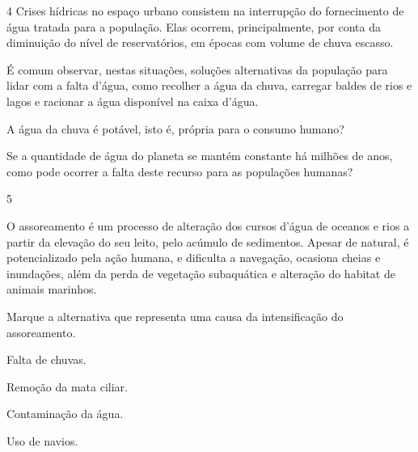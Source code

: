 \num{4} Crises hídricas no espaço urbano consistem na interrupção
do fornecimento de água tratada para a população. Elas ocorrem,
principalmente, por conta da diminuição do nível de reservatórios, em
épocas com volume de chuva escasso.

É comum observar, nestas situações, soluções alternativas da população
para lidar com a falta d'água, como recolher a água da chuva, carregar
baldes de rios e lagos e racionar a água disponível na caixa d'água.

\begin{escolha}
\item A água da chuva é potável, isto é, própria para o consumo
humano?



\item Se a quantidade de água do planeta se mantém constante há
milhões de anos, como pode ocorrer a falta deste recurso para as
populações humanas?


\end{escolha}

\num{5}

O assoreamento é um processo de alteração dos cursos
d'água de oceanos e rios a partir da elevação do seu leito, pelo acúmulo
de sedimentos. Apesar de natural, é potencializado pela ação humana, e
dificulta a navegação, ocasiona cheias e inundações, além da perda de
vegetação subaquática e alteração do habitat de animais marinhos.

Marque a alternativa que representa uma causa da intensificação do
assoreamento.

\begin{escolha}
\item Falta de chuvas.

\item Remoção da mata ciliar.

\item Contaminação da água.

\item Uso de navios.
\end{escolha}

